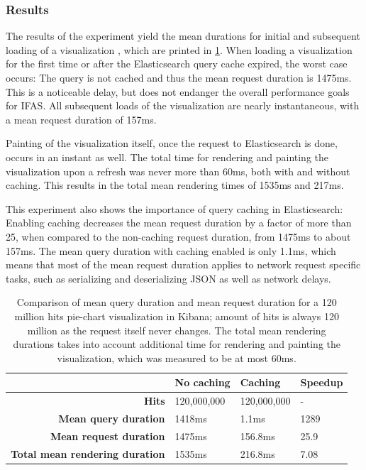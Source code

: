 \subsubsection{Results}

The results of the experiment yield the mean durations for initial and subsequent loading of a visualization , which are printed in \cref{table:kibana-config-comparison}.
When loading a visualization for the first time or after the Elasticsearch query cache expired, the worst case occurs: The query is not cached and thus the mean request duration is 1475ms.
This is a noticeable delay, but does not endanger the overall performance goals for \ac{IFAS}.
All subsequent loads of the visualization are nearly instantaneous, with a mean request duration of 157ms.

Painting of the visualization itself, once the request to Elasticsearch is done, occurs in an instant as well.
The total time for rendering and painting the visualization upon a refresh was never more than 60ms, both with and without caching.
This results in the total mean rendering times of 1535ms and 217ms.

This experiment also shows the importance of query caching in Elasticsearch:
Enabling caching decreases the mean request duration by a factor of more than 25, when compared to the non-caching request duration, from 1475ms to about 157ms.
The mean query duration with caching enabled is only 1.1ms, which means that most of the mean request duration applies to network request specific tasks, such as serializing and deserializing JSON as well as network delays.

\begin{table}
\caption{Comparison of mean query duration and mean request duration for a 120 million hits pie-chart visualization in Kibana; amount of hits is always 120 million as the request itself never changes. The total mean rendering durations takes into account additional time for rendering and painting the visualization, which was measured to be at most 60ms.}
\label{table:kibana-config-comparison}
\centering
\begin{tabular}{r|l|l|l}
& \textbf{No caching}                                      & \textbf{Caching} & \textbf{Speedup} \\ \hline
\textbf{Hits} & 120,000,000 & 120,000,000 & - \\ \hline
\textbf{Mean query duration} & 1418ms & 1.1ms & 1289 \\ \hline
\textbf{Mean request duration} & 1475ms & 156.8ms & 25.9 \\ \hline
\textbf{Total mean rendering duration} & 1535ms & 216.8ms & 7.08 \\

\end{tabular}
\end{table}


